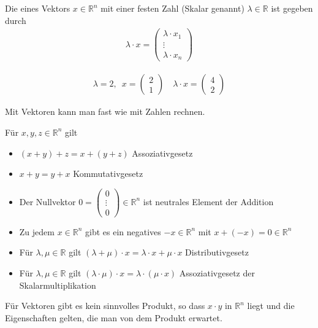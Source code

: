 Die  eines Vektors $x \in \mathbb{R}^n$ mit einer festen Zahl (Skalar genannt) $\lambda \in \mathbb{R}$ ist gegeben durch
\begin{align*}
	\lambda \cdot x = \begin{pmatrix} \lambda \cdot x_1 \\ \vdots \\ \lambda \cdot x_n \end{pmatrix}
\end{align*}

\begin{align*}
	\lambda = 2, \enspace x = \begin{pmatrix}2 \\ 1\end{pmatrix} \quad \lambda \cdot x = \begin{pmatrix}4 \\ 2\end{pmatrix}
\end{align*}

Mit Vektoren kann man fast wie mit Zahlen rechnen.

Für $x,y,z \in \mathbb{R}^n$ gilt
\begin{itemize}
	\item{$(x+y)+z = x+(y+z)$ Assoziativgesetz}
	\item{$x+y = y+x$ Kommutativgesetz}
	\item{Der Nullvektor $0 = \begin{pmatrix}0 \\ \vdots \\ 0\end{pmatrix} \in \mathbb{R}^n$ ist neutrales Element der Addition}
	\item{Zu jedem $x \in \mathbb{R}^n$ gibt es ein \glqq{}negatives\grqq{} $-x \in \mathbb{R}^n$ mit $x + (-x) = 0 \in \mathbb{R}^n$}
	\item{Für $\lambda,\mu \in \mathbb{R}$ gilt $(\lambda + \mu)\cdot x = \lambda \cdot x + \mu \cdot x$ Distributivgesetz}
	\item{Für $\lambda,\mu \in \mathbb{R}$ gilt $(\lambda \cdot \mu) \cdot x = \lambda \cdot (\mu \cdot x)$ Assoziativgesetz der Skalarmultiplikation}
\end{itemize}

Für Vektoren gibt es kein \glqq{}sinnvolles\grqq{} Produkt, so dass $x\cdot y$ in $\mathbb{R}^n$ liegt und die Eigenschaften gelten, die man von dem Produkt erwartet.

